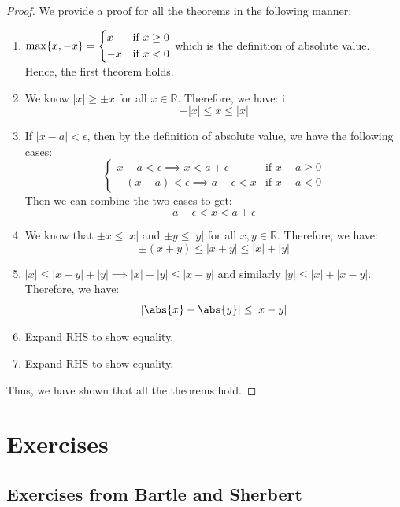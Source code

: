 \documentclass[openany]{book}
\numberwithin{equation}{section}
\begin{document}
\begin{proof}
    We provide a proof for all the theorems in the following manner:
    \begin{enumerate}
    \item $\max\{x, -x\} = \begin{dcases}
        x & \text{if } x \geq 0 \\
        -x & \text{if } x < 0
    \end{dcases}$ which is the definition of absolute value. Hence, the first theorem holds.
    \item We know $\left| x \right| \geq \pm x$ for all $x \in \mathbb{R}$. Therefore, we have:
i    $$-\left| x \right| \leq x \leq \left| x \right|$$
    \item If $\left| x - a \right| < \epsilon$, then by the definition of absolute value, we have the following cases: 
    $$\begin{cases}
        x - a < \epsilon \implies x < a + \epsilon & \text{if } x - a \geq 0  \\
        -(x - a) < \epsilon \implies a - \epsilon < x & \text{if } x - a < 0
    \end{cases}$$
    Then we can combine the two cases to get:
    $$a - \epsilon < x < a + \epsilon$$
    \item We know that $\pm x \leq \left| x \right|$ and $\pm y \leq \left| y \right|$ for all $x, y \in \mathbb{R}$. Therefore, we have:
    $$\pm(x + y) \leq \left| x + y \right| \leq \left| x \right| + \left| y \right|$$
    \item $\left| x \right| \leq \left| x-y \right| + \left| y \right| \implies \left| x \right| - \left| y \right| \leq \left| x - y \right|$ and similarly $\left| y \right| \leq \left| x \right| + \left| x - y \right|$. Therefore, we have:
    $$\left| \abs{x} - \abs{y} \right| \leq \left| x - y \right|$$
    \item Expand RHS to show equality.
    \item Expand RHS to show equality.
    \end{enumerate}
    Thus, we have shown that all the theorems hold.
\end{proof}
\section{Exercises}
\subsection{Exercises from Bartle and Sherbert}
\end{document}
